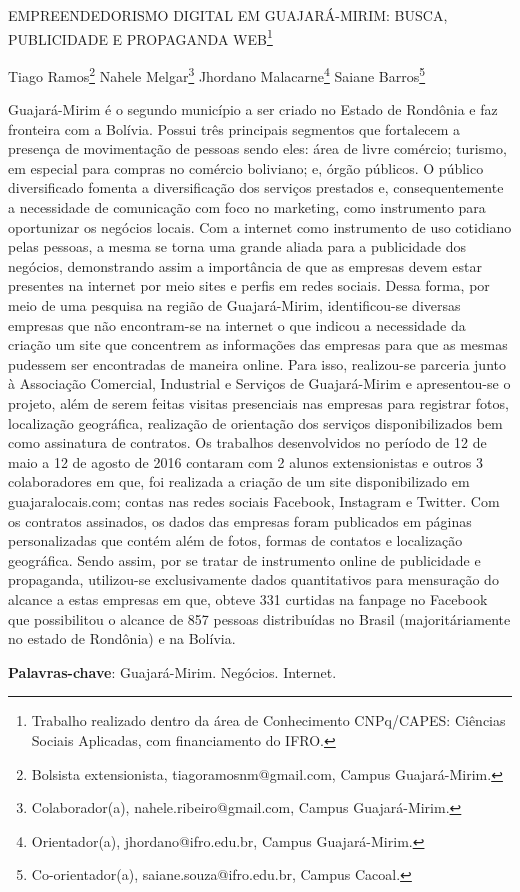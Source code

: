 \documentclass[article,12pt,onesidea,4paper,english,brazil]{abntex2}
\begin{document}
	
	
	\frenchspacing 
	
	\begin{center}
		\LARGE EMPREENDEDORISMO DIGITAL EM GUAJARÁ-MIRIM: BUSCA, PUBLICIDADE E PROPAGANDA WEB\footnote{Trabalho realizado dentro da área de Conhecimento CNPq/CAPES: Ciências Sociais Aplicadas, com financiamento do IFRO.}
		
		\normalsize
		Tiago Ramos\footnote{Bolsista extensionista, tiagoramosnm@gmail.com, Campus Guajará-Mirim.} 
		Nahele Melgar\footnote{Colaborador(a), nahele.ribeiro@gmail.com, Campus Guajará-Mirim.} 
		Jhordano Malacarne\footnote{Orientador(a), jhordano@ifro.edu.br, Campus Guajará-Mirim.} 
		Saiane Barros\footnote{Co-orientador(a), saiane.souza@ifro.edu.br, Campus Cacoal.} 
	\end{center}
	
	\noindent Guajará-Mirim é o segundo município a ser criado no Estado de Rondônia e faz fronteira com a Bolívia. Possui três principais segmentos que fortalecem a presença de movimentação de pessoas sendo eles: área de livre comércio; turismo, em especial para compras no comércio boliviano; e, órgão públicos. O público diversificado fomenta a diversificação dos serviços prestados e, consequentemente a necessidade de comunicação com foco no marketing, como instrumento para oportunizar os negócios locais. Com a internet como instrumento de uso cotidiano pelas pessoas, a mesma se torna uma grande aliada para a publicidade dos negócios, demonstrando assim a importância de que as empresas devem estar presentes na internet por meio sites e perfis em redes sociais. Dessa forma, por meio de uma pesquisa na região de Guajará-Mirim, identificou-se diversas empresas que não encontram-se na internet o que indicou a necessidade da criação um site que concentrem as informações das empresas para que as mesmas pudessem ser encontradas de maneira online. Para isso, realizou-se parceria junto à Associação Comercial, Industrial e Serviços de Guajará-Mirim e apresentou-se o projeto, além de serem feitas visitas presenciais nas empresas para registrar fotos, localização geográfica, realização de orientação dos serviços disponibilizados bem como assinatura de contratos. Os trabalhos desenvolvidos no período de 12 de maio a 12 de agosto de 2016 contaram com 2 alunos extensionistas e outros 3 colaboradores em que, foi realizada a criação de um site disponibilizado em guajaralocais.com; contas nas redes sociais Facebook, Instagram e Twitter. Com os contratos assinados, os dados das empresas foram publicados em páginas personalizadas  que contém além de fotos, formas de contatos e localização geográfica. Sendo assim, por se tratar de instrumento online de publicidade e propaganda, utilizou-se exclusivamente dados quantitativos para mensuração do alcance a estas empresas em que, obteve 331 curtidas na fanpage no Facebook que possibilitou o alcance de 857 pessoas distribuídas no Brasil (majoritáriamente no estado de Rondônia) e na Bolívia.
	
	\vspace{\onelineskip}
	
	\noindent
	\textbf{Palavras-chave}: Guajará-Mirim. Negócios. Internet.
	
\end{document}
